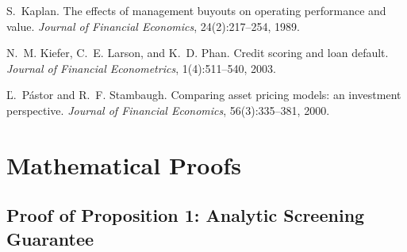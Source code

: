 \documentclass[11pt,a4paper]{article}
\begin{document}
\begin{thebibliography}{10}
S.~Kaplan.
\newblock The effects of management buyouts on operating performance and value.
\newblock \emph{Journal of Financial Economics}, 24(2):217--254, 1989.

N.~M. Kiefer, C.~E. Larson, and K.~D. Phan.
\newblock Credit scoring and loan default.
\newblock \emph{Journal of Financial Econometrics}, 1(4):511--540, 2003.

Ľ.~Pástor and R.~F. Stambaugh.
\newblock Comparing asset pricing models: an investment perspective.
\newblock \emph{Journal of Financial Economics}, 56(3):335--381, 2000.

\end{thebibliography}

\newpage
\appendix

\section{Mathematical Proofs}
\label{app:proofs}

\subsection{Proof of Proposition 1: Analytic Screening Guarantee}
\end{document}
